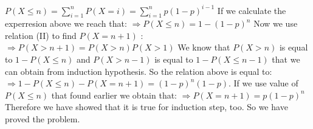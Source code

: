 \documentclass[12pt]{article}
\begin{document}
\newline $ P(X\le n)= \sum_{i=1}^{n}P(X=i) = \sum_{i=1}^{n} p(1-p)^{i-1} $
\newline \newline If we calculate the experresion above we reach that: \newline
\newline $\Rightarrow P(X\le n)= 1 - (1 - p)^{n} $ \newline \newline Now we use
relation (II) to find $P(X = n + 1)$ : \newline \newline $\Rightarrow P (X > n
    + 1) = P (X > n)P (X > 1)$ \newline \newline We know that $P(X>n)$ is equal to
$1-P(X\le n)$ and $P (X > n - 1)$ is equal to $1-P(X\le n-1)$ that we can
obtain from induction hypothesis. So the relation above is equal to: \newline
\newline $\Rightarrow 1 - P (X\le n) - P (X = n + 1) = (1 - p)^{n}(1 - p). $
\newline If we use value of $P(X\le n)$ that found earlier we obtain that:
\newline \newline $\Rightarrow P (X = n + 1) = p(1 - p)^{n} $ \newline \newline
Therefore we have showed that it is true for induction step, too. \newline So
we have proved the problem.\newline \newline \newpage
\end{document}
